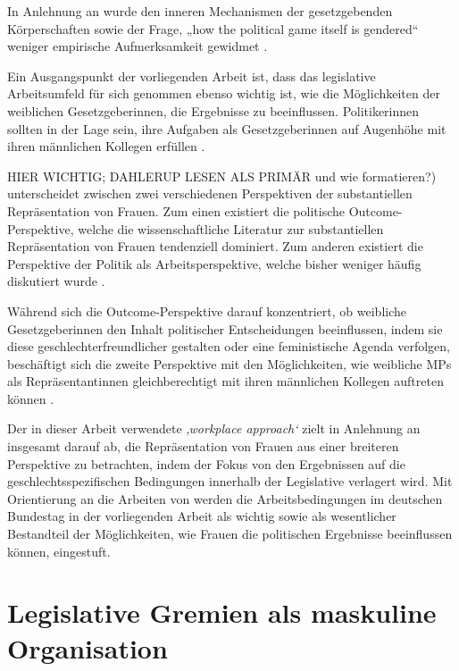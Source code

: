 \documentclass[12pt, 
    twoside=false, 
    bibliography=totoc, 
    numbers=endperiod, 
    headings=normal, 
    toc=chapterentrydotfill
    ]{scrbook}
\begin{document}
In Anlehnung an \textcite{erikson_2018} wurde den inneren Mechanismen der gesetzgebenden Körperschaften sowie der Frage, „how the political game itself is gendered“ weniger empirische Aufmerksamkeit gewidmet \parencites[199]{erikson_2018}[vgl.][]{childs_2016}{dahlerup_2013}{wangnerud_2015}.

Ein Ausgangspunkt der vorliegenden Arbeit ist, dass das legislative Arbeitsumfeld für sich genommen ebenso wichtig ist, wie die Möglichkeiten der weiblichen Gesetzgeberinnen, die Ergebnisse zu beeinflussen. Politikerinnen sollten in der Lage sein, ihre Aufgaben als Gesetzgeberinnen auf Augenhöhe mit ihren männlichen Kollegen erfüllen \parencite[199]{erikson_2018}. 

\textcites{dahlerup_2006}{dahlerup_1988} HIER WICHTIG; DAHLERUP LESEN ALS PRIMÄR und wie formatieren?) unterscheidet zwischen zwei verschiedenen Perspektiven der substantiellen Repräsentation von Frauen. Zum einen existiert die politische Outcome-Perspektive, welche die wissenschaftliche Literatur zur substantiellen Repräsentation von Frauen tendenziell dominiert. Zum anderen existiert die Perspektive der Politik als Arbeitsperspektive, welche bisher weniger häufig diskutiert wurde \parencites[513]{dahlerup_2006}[199]{erikson_2018}. 

Während sich die Outcome-Perspektive darauf konzentriert, ob weibliche Gesetzgeberinnen den Inhalt politischer Entscheidungen beeinflussen, indem sie diese geschlechterfreundlicher gestalten oder eine feministische Agenda verfolgen, beschäftigt sich die zweite Perspektive mit den Möglichkeiten, wie weibliche MPs als Repräsentantinnen gleichberechtigt mit ihren männlichen Kollegen auftreten können \parencites[199]{erikson_2018}{dahlerup_2006}{dahlerup_1988}.

Der in dieser Arbeit verwendete \emph{‚workplace approach‘} zielt in Anlehnung an \textcite{erikson_2018} insgesamt darauf ab, die Repräsentation von Frauen aus einer breiteren Perspektive zu betrachten, indem der Fokus von den Ergebnissen auf die geschlechtsspezifischen Bedingungen innerhalb der Legislative verlagert wird. Mit Orientierung an die Arbeiten von \textcites{dahlerup_2006}{dahlerup_1988}{erikson_2018 } werden die Arbeitsbedingungen im deutschen Bundestag in der vorliegenden Arbeit als wichtig sowie als wesentlicher Bestandteil der Möglichkeiten, wie Frauen die politischen Ergebnisse beeinflussen können, eingestuft.

\section{Legislative Gremien als maskuline Organisation }
\end{document}
